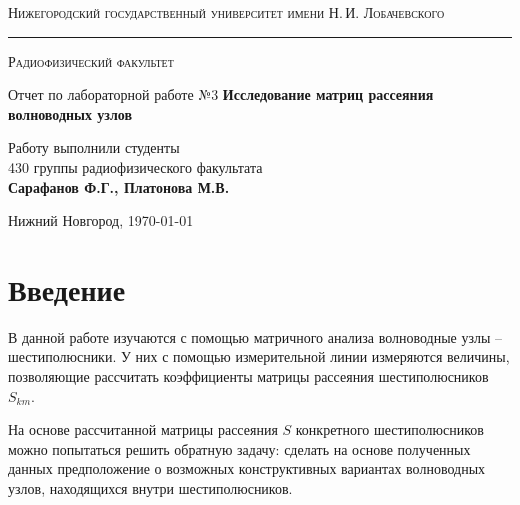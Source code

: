 \documentclass[a4paper,12pt]{article}
\def\labauthor{Сарафанов Ф.Г., Платонова М.В.}
\def\labnumber{3}
\def\labtheme{Исследование матриц рассеяния \\[0.4em] волноводных узлов}
\begin{document}
\begin{titlepage}

\begin{center}

{\textsc{Нижегородский государственный университет имени Н.\,И. Лобачевского}}
\vskip 2pt \hrule \vskip 3pt
{\textsc{Радиофизический факультет}}

\vfill


{{\LARGE Отчет по лабораторной работе №\labnumber}\vskip 12pt {\Huge \bfseries \labtheme}}

	
\vspace{2cm}
{\large Работу выполнили студенты \\[-0.25em] 430 группы радиофизического факультата \\[0.5em] {\Large \bfseries \labauthor}}



\end{center}

\vfill
	
	
	
\begin{center}
	{Нижний Новгород, \today}
\end{center}

\end{titlepage}

\tableofcontents
\newpage

\section*{Введение}
\label{sec:input}

В данной работе изучаются с помощью матричного анализа волноводные узлы -- шестиполюсники. У них с помощью измерительной линии измеряются величины, позволяющие рассчитать коэффициенты матрицы рассеяния шестиполюсников $S_{km}$. 

На основе рассчитанной матрицы рассеяния $S$ конкретного шестиполюсников можно попытаться решить обратную задачу: сделать на основе полученных данных предположение о возможных конструктивных вариантах волноводных узлов, находящихся внутри шестиполюсников.
\end{document}
